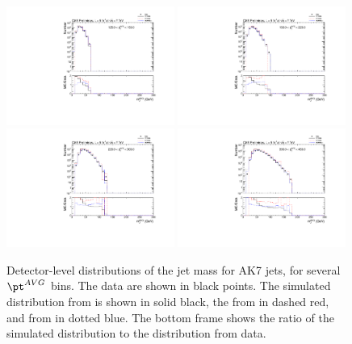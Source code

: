 \begin{figure}[htbp]
\centering
\includegraphics[width=0.49\textwidth]{figs/histAK7MjetVsPtAvg_rawDataMCComparisons_pt_2}
\includegraphics[width=0.49\textwidth]{figs/histAK7MjetVsPtAvg_rawDataMCComparisons_pt_3}
\includegraphics[width=0.49\textwidth]{figs/histAK7MjetVsPtAvg_rawDataMCComparisons_pt_4}
\includegraphics[width=0.49\textwidth]{figs/histAK7MjetVsPtAvg_rawDataMCComparisons_pt_5}
\caption{Detector-level distributions of the jet mass for AK7 jets,
for several $\pt^{AVG}$ bins. The data are shown in black points.
The simulated distribution from \PYTHIA is shown in solid black, 
the from \PYTHIAEIGHT in dashed red, and from \HERWIG in dotted blue. 
The bottom frame shows the ratio of the simulated distribution
to the distribution from data. 
\label{figs:histAK7MjetVsPtAvg_rawDataMCComparisons_pt_2}}
\end{figure}

